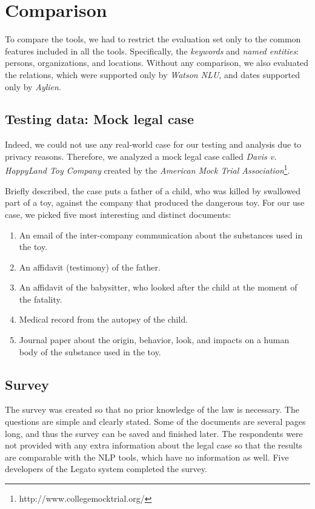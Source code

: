 \documentclass[
  digital, %
  notable,   %
  nolof,     %
  nolot,     %
]{fithesis3}
\begin{document}
\section{Comparison}
To compare the tools, we had to restrict the evaluation set only to the common features included in all the tools.
Specifically, the \textit{keywords} and \textit{named entities}: persons, organizations, and locations.
Without any comparison, we also evaluated the relations, which were supported only by \textit{Watson NLU}, and dates supported only by \textit{Aylien}.

\subsection{Testing data: Mock legal case}
\label{sec:davis_legal_case}
Indeed, we could not use any real-world case for our testing and analysis due to privacy reasons.
Therefore, we analyzed a mock legal case called \textit{Davis v. HappyLand Toy Company}\cite{american2015davis} created by the \textit{American Mock Trial Association}\footnote{http://www.collegemocktrial.org/}.

Briefly described, the case puts a father of a child, who was killed by swallowed part of a toy, against the company that produced the dangerous toy. For our use case, we picked five most interesting and distinct documents: 
\begin{enumerate}
\item An email of the inter-company communication about the substances used in the toy.
\item An affidavit (testimony) of the father.
\item An affidavit of the babysitter, who looked after the child at the moment of the fatality.
\item Medical record from the autopsy of the child.
\item Journal paper about the origin, behavior, look, and impacts on a human body of the substance used in the toy.
\end{enumerate}

\subsection{Survey}
The survey was created so that no prior knowledge of the law is necessary.
The questions are simple and clearly stated.
Some of the documents are several pages long, and thus the survey can be saved and finished later.
The respondents were not provided with any extra information about the legal case so that the results are comparable with the NLP tools, which have no information as well.
Five developers of the Legato system completed the survey.
\end{document}
